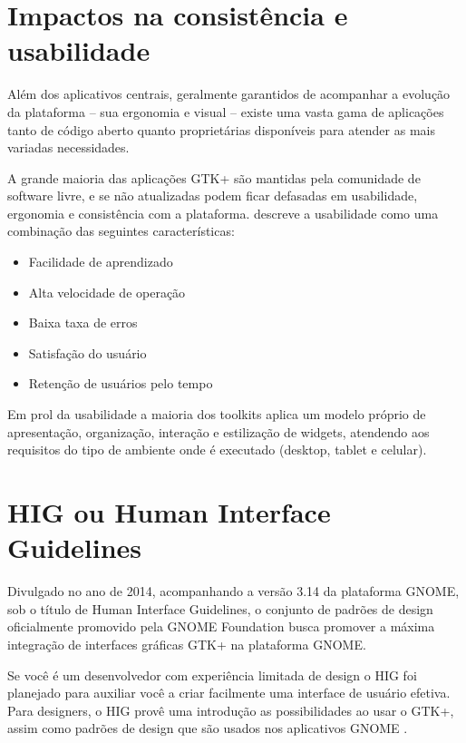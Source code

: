 \section{Impactos na consistência e usabilidade}

Além dos aplicativos centrais, geralmente garantidos de acompanhar a evolução
da plataforma -- sua ergonomia e visual -- existe uma vasta gama de aplicações
tanto de código aberto quanto proprietárias disponíveis para atender as mais
variadas necessidades.

A grande maioria das aplicações GTK+ são mantidas pela comunidade de software
livre, e se não atualizadas podem ficar defasadas em usabilidade, ergonomia e
consistência com a plataforma.  descreve
a usabilidade como uma combinação das seguintes características:

\begin{itemize}
    \item Facilidade de aprendizado
    \item Alta velocidade de operação
    \item Baixa taxa de erros
    \item Satisfação do usuário
    \item Retenção de usuários pelo tempo
\end{itemize}

Em prol da usabilidade a maioria dos toolkits aplica um modelo próprio de
apresentação, organização, interação e estilização de widgets, atendendo aos
requisitos do tipo de ambiente onde é executado (desktop, tablet e celular).

\section{HIG ou Human Interface Guidelines}

Divulgado no ano de 2014, acompanhando a versão 3.14 da plataforma GNOME, sob o
título de Human Interface Guidelines, o conjunto de padrões de design
oficialmente promovido pela GNOME Foundation busca promover a máxima integração
de interfaces gráficas GTK+ na plataforma GNOME.

\begin{citacao}
    Se você é um desenvolvedor com experiência limitada de design o HIG foi
    planejado para auxiliar você a criar facilmente uma interface de usuário
    efetiva. Para designers, o HIG provê uma introdução as possibilidades ao
    usar o GTK+, assim como padrões de design que são usados nos aplicativos
    GNOME \cite{gnome314hig}.
\end{citacao}

